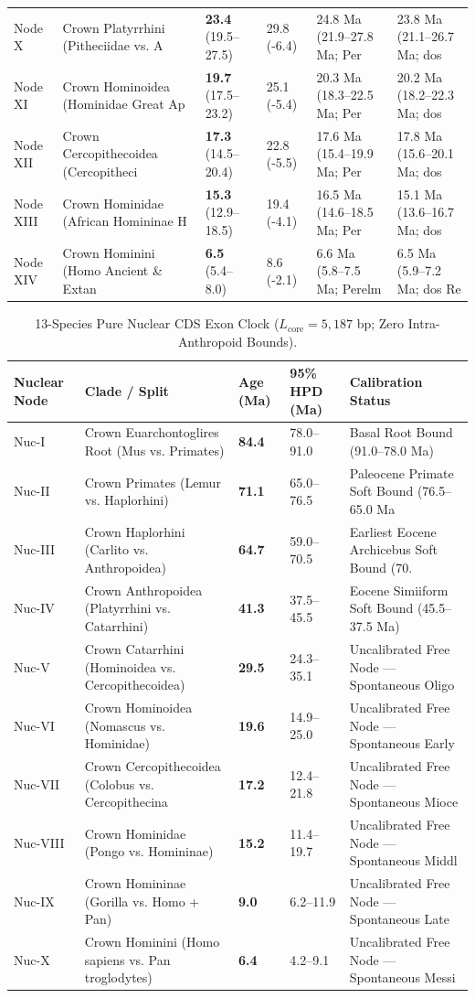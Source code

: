 \documentclass[10pt,letterpaper]{article}
\begin{document}
\begin{longtable}{llllll}
Node X & Crown Platyrrhini (Pitheciidae vs. A & \textbf{23.4} (19.5--27.5) & 29.8 (-6.4) & 24.8 Ma (21.9--27.8 Ma; Per & 23.8 Ma (21.1--26.7 Ma; dos \\
Node XI & Crown Hominoidea (Hominidae Great Ap & \textbf{19.7} (17.5--23.2) & 25.1 (-5.4) & 20.3 Ma (18.3--22.5 Ma; Per & 20.2 Ma (18.2--22.3 Ma; dos \\
Node XII & Crown Cercopithecoidea (Cercopitheci & \textbf{17.3} (14.5--20.4) & 22.8 (-5.5) & 17.6 Ma (15.4--19.9 Ma; Per & 17.8 Ma (15.6--20.1 Ma; dos \\
Node XIII & Crown Hominidae (African Homininae H & \textbf{15.3} (12.9--18.5) & 19.4 (-4.1) & 16.5 Ma (14.6--18.5 Ma; Per & 15.1 Ma (13.6--16.7 Ma; dos \\
Node XIV & Crown Hominini (Homo Ancient \& Extan & \textbf{6.5} (5.4--8.0) & 8.6 (-2.1) & 6.6 Ma (5.8--7.5 Ma; Perelm & 6.5 Ma (5.9--7.2 Ma; dos Re \\
\bottomrule
\end{longtable}

\begin{longtable}{lllll}
\caption{13-Species Pure Nuclear CDS Exon Clock ($L_{\mathrm{core}} = 5,187$ bp; Zero Intra-Anthropoid Bounds).} \\
\toprule
Nuclear Node & Clade / Split & Age (Ma) & 95\% HPD (Ma) & Calibration Status \\
\midrule
\endfirsthead
Nuc-I & Crown Euarchontoglires Root (Mus vs. Primates) & \textbf{84.4} & 78.0--91.0 & Basal Root Bound (91.0--78.0 Ma) \\
Nuc-II & Crown Primates (Lemur vs. Haplorhini) & \textbf{71.1} & 65.0--76.5 & Paleocene Primate Soft Bound (76.5--65.0 Ma \\
Nuc-III & Crown Haplorhini (Carlito vs. Anthropoidea) & \textbf{64.7} & 59.0--70.5 & Earliest Eocene Archicebus Soft Bound (70. \\
Nuc-IV & Crown Anthropoidea (Platyrrhini vs. Catarrhini) & \textbf{41.3} & 37.5--45.5 & Eocene Simiiform Soft Bound (45.5--37.5 Ma) \\
Nuc-V & Crown Catarrhini (Hominoidea vs. Cercopithecoidea) & \textbf{29.5} & 24.3--35.1 & Uncalibrated Free Node --- Spontaneous Oligo \\
Nuc-VI & Crown Hominoidea (Nomascus vs. Hominidae) & \textbf{19.6} & 14.9--25.0 & Uncalibrated Free Node --- Spontaneous Early \\
Nuc-VII & Crown Cercopithecoidea (Colobus vs. Cercopithecina & \textbf{17.2} & 12.4--21.8 & Uncalibrated Free Node --- Spontaneous Mioce \\
Nuc-VIII & Crown Hominidae (Pongo vs. Homininae) & \textbf{15.2} & 11.4--19.7 & Uncalibrated Free Node --- Spontaneous Middl \\
Nuc-IX & Crown Homininae (Gorilla vs. Homo + Pan) & \textbf{9.0} & 6.2--11.9 & Uncalibrated Free Node --- Spontaneous Late  \\
Nuc-X & Crown Hominini (Homo sapiens vs. Pan troglodytes) & \textbf{6.4} & 4.2--9.1 & Uncalibrated Free Node --- Spontaneous Messi \\
\bottomrule
\end{longtable}
\end{document}
